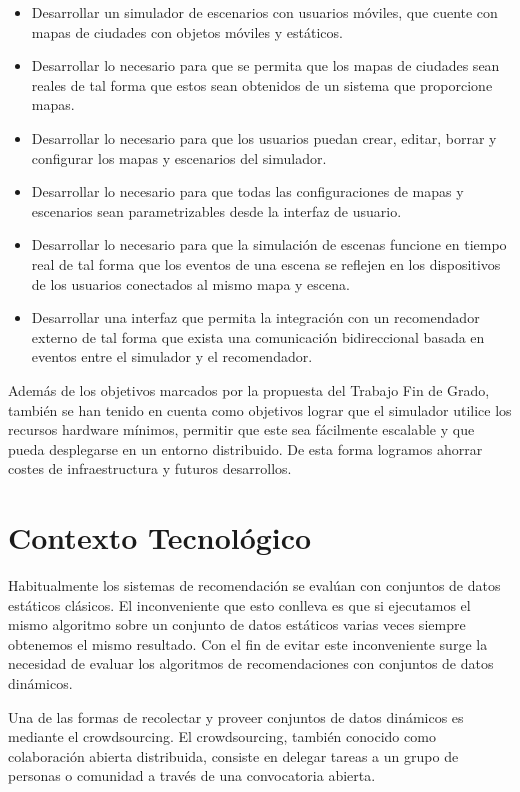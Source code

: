 \begin{itemize}
       \item Desarrollar un simulador de escenarios con usuarios móviles, que cuente con mapas de ciudades con objetos móviles y estáticos.
       \item Desarrollar lo necesario para que se permita que los mapas de ciudades sean reales de tal forma que estos sean obtenidos de un sistema que proporcione mapas.
       \item Desarrollar lo necesario para que los usuarios puedan crear, editar, borrar y configurar los mapas y escenarios del simulador.
       \item Desarrollar lo necesario para que todas las configuraciones de mapas y escenarios sean parametrizables desde la interfaz de usuario.
       \item Desarrollar lo necesario para que la simulación de escenas funcione en tiempo real de tal forma que los eventos de una escena se reflejen en los dispositivos de los usuarios conectados al mismo mapa y escena.
       \item Desarrollar una interfaz que permita la integración con un recomendador externo de tal forma que exista una comunicación bidireccional basada en eventos entre el simulador y el recomendador.
\end{itemize}

Además de los objetivos marcados por la propuesta del Trabajo Fin de Grado, también se han tenido en cuenta como objetivos lograr que el simulador utilice los recursos hardware mínimos, permitir que este sea fácilmente escalable y que pueda desplegarse en un entorno distribuido. De esta forma logramos ahorrar costes de infraestructura y futuros desarrollos.

\section{Contexto Tecnológico}

Habitualmente los sistemas de recomendación se evalúan con conjuntos de datos estáticos clásicos. El inconveniente que esto conlleva es que si ejecutamos el mismo algoritmo sobre un conjunto de datos estáticos varias veces siempre obtenemos el mismo resultado. Con el fin de evitar este inconveniente surge la necesidad de evaluar los algoritmos de recomendaciones con conjuntos de datos dinámicos. 

Una de las formas de recolectar y proveer conjuntos de datos dinámicos es mediante el crowdsourcing. El crowdsourcing, también conocido como colaboración abierta distribuida, consiste en delegar tareas a un grupo de personas o comunidad a través de una convocatoria abierta. 

